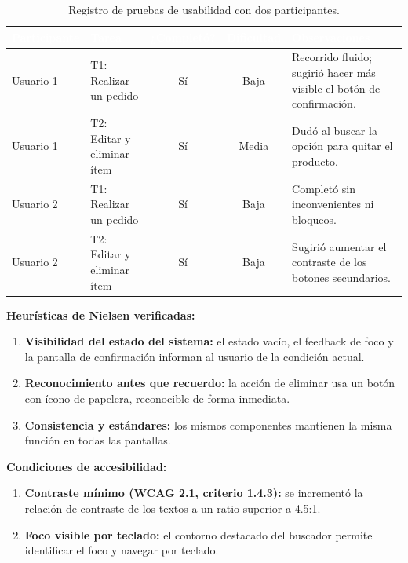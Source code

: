 \documentclass{article}
\begin{document}
\begin{table}[H]
\centering
\renewcommand{\arraystretch}{1.4}
\begin{tabularx}{\textwidth}{|l|X|c|c|X|}
\hline
\rowcolor{headerblue}
\textcolor{white}{\textbf{Participante}} & \textcolor{white}{\textbf{Tarea}} & \textcolor{white}{\textbf{¿Completó?}} & \textcolor{white}{\textbf{Dificultad}} & \textcolor{white}{\textbf{Observaciones}} \\ \hline
Usuario 1 & T1: Realizar un pedido & Sí & Baja & Recorrido fluido; sugirió hacer más visible el botón de confirmación. \\ \hline
Usuario 1 & T2: Editar y eliminar ítem & Sí & Media & Dudó al buscar la opción para quitar el producto. \\ \hline
Usuario 2 & T1: Realizar un pedido & Sí & Baja & Completó sin inconvenientes ni bloqueos. \\ \hline
Usuario 2 & T2: Editar y eliminar ítem & Sí & Baja & Sugirió aumentar el contraste de los botones secundarios. \\ \hline
\end{tabularx}
\caption{Registro de pruebas de usabilidad con dos participantes.}
\end{table}

\textbf{Heurísticas de Nielsen verificadas:}
\begin{enumerate}[leftmargin=1.5em, itemsep=3pt]
    \item \textbf{Visibilidad del estado del sistema:} el estado vacío, el feedback de foco y la pantalla de confirmación informan al usuario de la condición actual.
    \item \textbf{Reconocimiento antes que recuerdo:} la acción de eliminar usa un botón con ícono de papelera, reconocible de forma inmediata.
    \item \textbf{Consistencia y estándares:} los mismos componentes mantienen la misma función en todas las pantallas.
\end{enumerate}

\textbf{Condiciones de accesibilidad:}
\begin{enumerate}[leftmargin=1.5em, itemsep=3pt]
    \item \textbf{Contraste mínimo (WCAG 2.1, criterio 1.4.3):} se incrementó la relación de contraste de los textos a un ratio superior a 4.5:1.
    \item \textbf{Foco visible por teclado:} el contorno destacado del buscador permite identificar el foco y navegar por teclado.
\end{enumerate}
\end{document}
